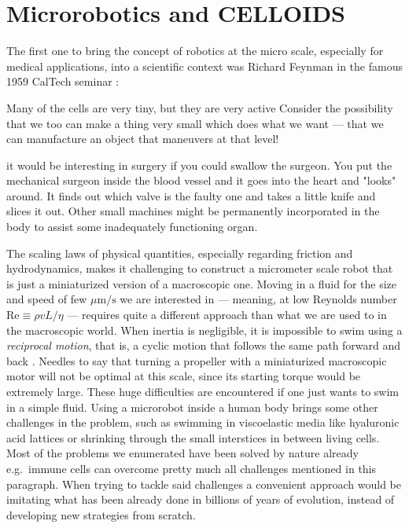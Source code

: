\documentclass[../../master_thesis_np.tex]{subfiles}
\begin{document}
	\section{Microrobotics and CELLOIDS}
	The first one to bring the concept of robotics at the micro scale, especially for medical applications, into a scientific context was Richard Feynman in the famous 1959 CalTech seminar  \cite{Feynman}:
	\begin{displayquote}
		Many of the cells are very tiny, but they are very active \omissis Consider the possibility that we too can make a thing very small which does what we want — that we can manufacture an object that maneuvers at that level!
		
		\omissis it would be interesting in surgery if you could swallow the surgeon. You put the mechanical surgeon inside the blood vessel and it goes into the heart and "looks" around. \omissis It finds out which valve is the faulty one and takes a little knife and slices it out. Other small machines might be permanently incorporated in the body to assist some inadequately functioning organ.
	\end{displayquote}
	
	The scaling laws of physical quantities, especially regarding friction and hydrodynamics, makes it challenging to construct a micrometer scale robot that is just a miniaturized version of a macroscopic one. 
	Moving in a fluid for the size and speed of few $\mu\text{m/s}$ we are interested in --- meaning, at low Reynolds number $\mathrm{Re} \equiv \rho v L/\eta$ --- requires quite a different approach than what we are used to in the macroscopic world. 
	When inertia is negligible, it is impossible to swim using a \emph{reciprocal motion}, that is, a cyclic motion that follows the same path forward and back \cite{purcell_life_1977}. 
	Needles to say that turning a propeller with a miniaturized macroscopic motor will not be optimal at this scale, since its starting torque would be extremely large. 
	These huge difficulties are encountered if one just wants to swim in a simple fluid. 
	Using a microrobot inside a human body brings some other challenges in the problem, such as swimming in viscoelastic media like hyaluronic acid lattices or shrinking through the small interstices in between living cells. 
	Most of the problems we enumerated have been solved by nature already e.g.\ immune cells can overcome pretty much all challenges mentioned in this paragraph. 
	When trying to tackle said challenges a convenient approach would be imitating what has been already done in billions of years of evolution, instead of developing new strategies from scratch.
	
\end{document}
